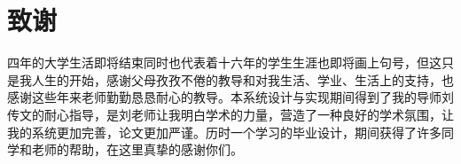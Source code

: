\section*{致谢}
四年的大学生活即将结束同时也代表着十六年的学生生涯也即将画上句号，但这只是我人生的开始，感谢父母孜孜不倦的教导和对我生活、学业、生活上的支持，也感谢这些年来老师勤勤恳恳耐心的教导。本系统设计与实现期间得到了我的导师刘传文的耐心指导，是刘老师让我明白学术的力量，营造了一种良好的学术氛围，让我的系统更加完善，论文更加严谨。历时一个学习的毕业设计，期间获得了许多同学和老师的帮助，在这里真挚的感谢你们。
